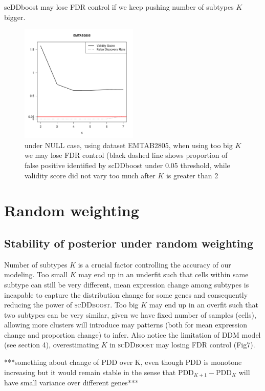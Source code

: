 \documentclass[aoas,preprint]{imsart}
\begin{document}
scDDboost may lose FDR control if we keep pushing number of subtypes $K$ bigger.
\begin{figure}[h]
\includegraphics[width = 0.5\textwidth]{Figs/breakFDR.pdf}
 \caption{under NULL case, using dataset EMTAB2805, when using too big $K$ we may lose FDR control (black dashed line shows proportion of false positive identified by scDDboost under 0.05 threshold, while validity score did not vary too much after $K$ is
 greater than 2 }
  \label{fig:7}
\end{figure}




\section{Random weighting}


\subsection{Stability of posterior under random weighting}

Number of subtypes $K$ is a crucial factor controlling the accuracy of our modeling. 
Too small $K$ may end up in an underfit such that cells within same subtype can still be very different,
mean expression change among subtypes is incapable to capture the distribution change for some genes and consequently reducing the power of \textsc{scDDboost}.
Too big $K$ may end up in an overfit such that two subtypes can be very similar, given we have fixed number of samples (cells), allowing more clusters will introduce may patterns (both for mean expression change and proportion change) to infer. Also notice the limitation of DDM model (see section 4), overestimating $K$ in \textsc{scDDboost} may losing FDR control (Fig7).

***something about change of PDD over K, even though PDD is monotone increasing but it would remain stable in the sense that $\text{PDD}_{K+1} - \text{PDD}_K$ will have small variance over different genes***
\end{document}
